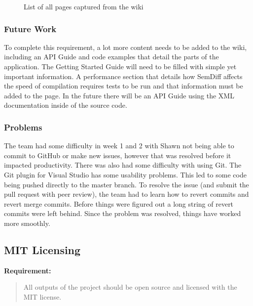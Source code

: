 \documentclass[draftclsnofoot,onecolumn]{IEEEtran}
\begin{document}
\begin{figure}[!t]
\caption{List of all pages captured from the wiki}
\label{wikilist}
\end{figure}

\subsubsection{Future Work}

To complete this requirement, a lot more content needs to be added to the 
wiki, including an API Guide and code examples that detail the parts of the 
application. The Getting Started Guide will need to be filled with simple yet 
important information. A performance section that details how SemDiff affects 
the speed of compilation requires tests to be run and that information must 
be added to the page. In the future there will be an API Guide using the XML 
documentation inside of the source code.

\subsubsection{Problems}

The team had some difficulty in week 1 and 2 with Shawn not being able to 
commit to GitHub or make new issues, however that was resolved before it 
impacted productivity. There was also had some difficulty with using Git. The 
Git plugin for Visual Studio has some usability problems. This led to some 
code being pushed directly to the master branch. To resolve the issue (and 
submit the pull request with peer review), the team had to learn how to 
revert commits and revert merge commits. Before things were figured out a 
long string of revert commits were left behind. Since the problem was 
resolved, things have worked more smoothly.

\subsection{MIT Licensing}%

\textbf{Requirement:}

\begin{quote}

All outputs of the project should be open source and licensed with the MIT 
license.

\end{quote}
\end{document}
